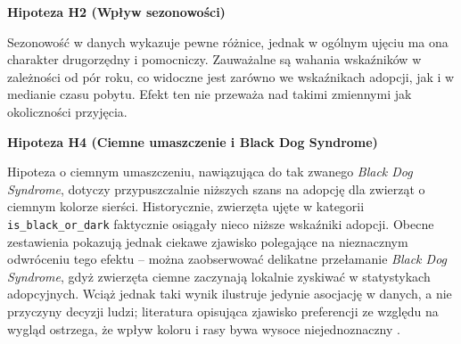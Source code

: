 

\textbf{Hipoteza H2 (Wpływ sezonowości)}

Sezonowość w danych wykazuje pewne różnice, jednak w ogólnym ujęciu ma ona charakter drugorzędny i pomocniczy. Zauważalne są wahania wskaźników w zależności od pór roku, co widoczne jest zarówno we wskaźnikach adopcji, jak i w medianie czasu pobytu. Efekt ten nie przeważa nad takimi zmiennymi jak okoliczności przyjęcia.



\textbf{Hipoteza H4 (Ciemne umaszczenie i Black Dog Syndrome)}

Hipoteza o ciemnym umaszczeniu, nawiązująca do tak zwanego \emph{Black Dog Syndrome}, dotyczy przypuszczalnie niższych szans na adopcję dla zwierząt o ciemnym kolorze sierści. Historycznie, zwierzęta ujęte w kategorii \texttt{is\_black\_or\_dark} faktycznie osiągały nieco niższe wskaźniki adopcji. Obecne zestawienia pokazują jednak ciekawe zjawisko polegające na nieznacznym odwróceniu tego efektu -- można zaobserwować delikatne przełamanie \emph{Black Dog Syndrome}, gdyż zwierzęta ciemne zaczynają lokalnie zyskiwać w statystykach adopcyjnych. Wciąż jednak taki wynik ilustruje jedynie asocjację w danych, a nie przyczyny decyzji ludzi; literatura opisująca zjawisko preferencji ze względu na wygląd ostrzega, że wpływ koloru i rasy bywa wysoce niejednoznaczny \cite{svoboda2015,Gunter2016,Cain2020}.



